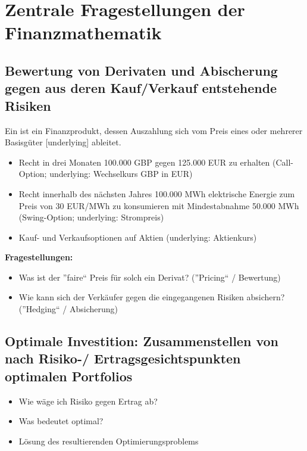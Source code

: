 \section{Zentrale Fragestellungen der Finanzmathematik}

\subsection{Bewertung von Derivaten und Abischerung gegen aus deren Kauf/Verkauf entstehende Risiken}

\begin{definition}[Derivat]
	Ein  ist ein Finanzprodukt, dessen Auszahlung sich vom Preis eines oder mehrerer Basisgüter [underlying] ableitet.
\end{definition}

\begin{beispiel}
	\begin{itemize}[nolistsep, leftmargin=*, topsep=-\parskip]
		\item Recht in drei Monaten 100.000 GBP gegen 125.000 EUR zu erhalten (Call-Option; underlying: Wechselkurs GBP in EUR)
		\item Recht innerhalb des nächsten Jahres 100.000 MWh elektrische Energie zum Preis von 30 EUR/MWh zu konsumieren mit Mindestabnahme 50.000 MWh (Swing-Option; underlying: Strompreis)
		\item Kauf- und Verkaufsoptionen auf Aktien (underlying: Aktienkurs)
	\end{itemize}
\end{beispiel}

\textbf{Fragestellungen:}
\begin{itemize}[nolistsep, label=--, topsep=-\parskip]
	\item Was ist der ''faire`` Preis für solch ein Derivat? (''Pricing`` / Bewertung)
	\item Wie kann sich der Verkäufer gegen die eingegangenen Risiken absichern? (''Hedging`` / Absicherung)
\end{itemize}

\subsection{Optimale Investition: Zusammenstellen von nach Risiko-/ Ertragsgesichtspunkten optimalen Portfolios}

\begin{itemize}[nolistsep, leftmargin=*, topsep=-\parskip]
	\item Wie wäge ich Risiko gegen Ertrag ab?
	\item Was bedeutet optimal?
	\item Lösung des resultierenden Optimierungsproblems
\end{itemize}

